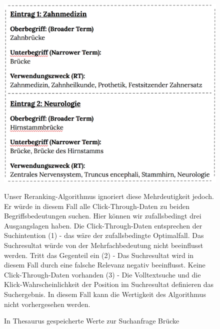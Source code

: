 \begin{figure}[H]
\centering
\begin{minipage}{0.45\linewidth}
        \centering
        \vspace{-2em}
		\caption[In Thesaurus gespeicherte Werte zur Suchanfrage \glqq Brücke\grqq{}]{In 		Thesaurus gespeicherte Werte zur Suchanfrage \glqq Brücke\grqq{}}
		\label{fig:ThesaurusBruecke}
		\includegraphics[width=\linewidth]{gfx/BeispielMehrdeutigkeit}
		\vspace{-3em}
    \end{minipage}
    \hfill
    \begin{minipage}{0.45\linewidth}
        Unser Reranking-Algorithmus ignoriert diese Mehrdeutigkeit jedoch. Er würde in diesem Fall alle Click-Through-Daten zu beiden Begriffsbedeutungen suchen. Hier können wir zufallsbedingt drei Ausgangslagen haben. Die Click-Through-Daten entsprechen der Suchintention (1) - das wäre der zufallsbedingte Optimalfall. Das Suchresultat würde von der Mehrfachbedeutung nicht beeinflusst werden. Tritt das Gegenteil ein (2) - Das Suchresultat wird in diesem Fall durch eine falsche Relevanz negativ beeinflusst. Keine Click-Through-Daten vorhanden (3) - Die Volltextsuche und die Klick-Wahrscheinlichkeit der Position im Suchresultat definieren das Suchergebnis. In diesem Fall kann die Wertigkeit des Algorithmus nicht vorhergesehen werden.
    \end{minipage}
\end{figure}

